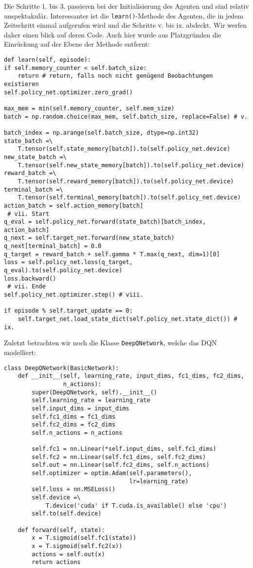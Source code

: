Die Schritte 1. bis 3. passieren bei der Initialisierung des Agenten und sind relativ unspektakulär. Interessanter ist die \texttt{learn()}-Methode des Agenten, die in jedem Zeitschritt einmal aufgerufen wird und die Schritte v. bis ix. abdeckt. Wir werfen daher einen blick auf deren Code. Auch hier wurde aus Platzgründen die Einrückung auf der Ebene der Methode entfernt:
\begin{verbatim}
def learn(self, episode):
if self.memory_counter < self.batch_size:
    return # return, falls noch nicht genügend Beobachtungen existieren
self.policy_net.optimizer.zero_grad()

max_mem = min(self.memory_counter, self.mem_size)
batch = np.random.choice(max_mem, self.batch_size, replace=False) # v.

batch_index = np.arange(self.batch_size, dtype=np.int32)
state_batch =\
    T.tensor(self.state_memory[batch]).to(self.policy_net.device)
new_state_batch =\
    T.tensor(self.new_state_memory[batch]).to(self.policy_net.device)
reward_batch =\
    T.tensor(self.reward_memory[batch]).to(self.policy_net.device)
terminal_batch =\
    T.tensor(self.terminal_memory[batch]).to(self.policy_net.device)
action_batch = self.action_memory[batch]
 # vii. Start
q_eval = self.policy_net.forward(state_batch)[batch_index, action_batch]
q_next = self.target_net.forward(new_state_batch)
q_next[terminal_batch] = 0.0
q_target = reward_batch + self.gamma * T.max(q_next, dim=1)[0]
loss = self.policy_net.loss(q_target, q_eval).to(self.policy_net.device)
loss.backward()
 # vii. Ende
self.policy_net.optimizer.step() # viii.

if episode % self.target_update == 0:
    self.target_net.load_state_dict(self.policy_net.state_dict()) # ix.
\end{verbatim}
Zuletzt betrachten wir noch die Klasse \texttt{DeepQNetwork}, welche das DQN modelliert:
\begin{verbatim}
class DeepQNetwork(BasicNetwork):
    def __init__(self, learning_rate, input_dims, fc1_dims, fc2_dims,
                 n_actions):
        super(DeepQNetwork, self).__init__()
        self.learning_rate = learning_rate
        self.input_dims = input_dims
        self.fc1_dims = fc1_dims
        self.fc2_dims = fc2_dims
        self.n_actions = n_actions

        self.fc1 = nn.Linear(*self.input_dims, self.fc1_dims)
        self.fc2 = nn.Linear(self.fc1_dims, self.fc2_dims)
        self.out = nn.Linear(self.fc2_dims, self.n_actions)
        self.optimizer = optim.Adam(self.parameters(),
                                    lr=learning_rate)
        self.loss = nn.MSELoss()
        self.device =\
            T.device('cuda' if T.cuda.is_available() else 'cpu')
        self.to(self.device)

    def forward(self, state):
        x = T.sigmoid(self.fc1(state))
        x = T.sigmoid(self.fc2(x))
        actions = self.out(x)
        return actions
\end{verbatim}

